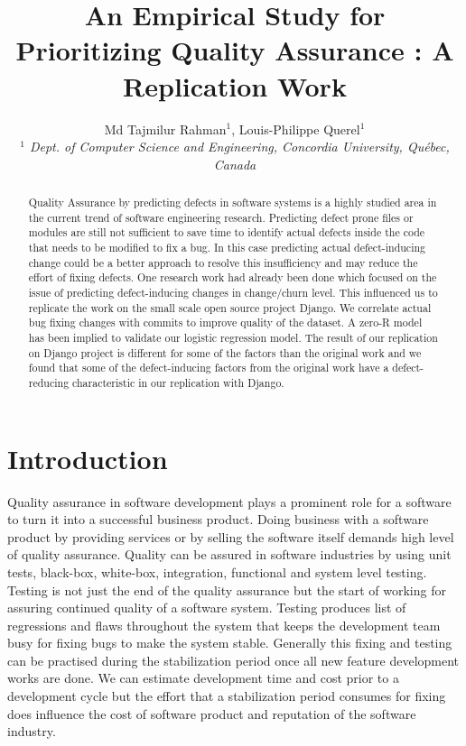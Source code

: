 \documentclass[10pt, conference]{IEEEtran}
\title{An Empirical Study for Prioritizing Quality Assurance : A Replication Work}
\author{Md Tajmilur Rahman$^{1}$, Louis-Philippe Querel$^{1}$
    \\
	\emph{$^{1}$ Dept. of Computer Science and Engineering, Concordia University, Qu\'{e}bec, Canada}
}
\begin{document}
\maketitle

\begin{abstract}
Quality Assurance by predicting defects in software systems is a highly studied area in the current trend of software engineering research. Predicting defect prone files or modules are still not sufficient to save time to identify actual defects inside the code that needs to be modified to fix a bug. In this case predicting actual defect-inducing change could be a better approach to resolve this insufficiency and may reduce the effort of fixing defects. One research work had already been done which focused on the issue of predicting defect-inducing changes in change/churn level. This influenced us to replicate the work on the small scale open source project Django. We correlate actual bug fixing changes with commits to improve quality of the dataset. A zero-R model has been implied to validate our logistic regression model. The result of our replication on Django project is different for some of the factors than the original work and we found that some of the defect-inducing factors from the original work have a defect-reducing characteristic in our replication with Django.

\end{abstract}

\section{Introduction}
\label{sec:introduction}

Quality assurance in software development plays a prominent role for a software to turn it into a successful business product. Doing business with a software product by providing services or by selling the software itself demands high level of quality assurance. Quality can be assured in software industries by using unit tests, black-box, white-box, integration, functional and system level testing. Testing is not just the end of the quality assurance but the start of working for assuring continued quality of a software system. Testing produces list of regressions and flaws throughout the system that keeps the development team busy for fixing bugs to make the system stable. Generally this fixing and testing can be practised during the stabilization period once all new feature development works are done. We can estimate development time and cost prior to a development cycle but the effort that a stabilization period consumes for fixing does influence the cost of software product and reputation of the software industry.
\end{document}
